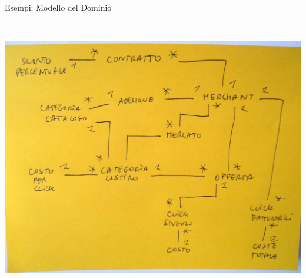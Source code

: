 \begin{frame}{Esempi: Modello del Dominio}
\begin{columns}[T]
\begin{column}{.5\textwidth}
				\\ \vspace*{0.3cm}
				\hspace*{-0.3cm} \includegraphics[scale=0.13]{images/domain-3}
		    \end{column}
		 \end{columns}
	\end{frame}
	
